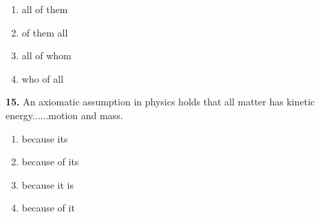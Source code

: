 \documentclass[12pt]{article}
\begin{document}
\begin{enumerate}[label=(\Alph*),leftmargin=*,itemsep=0.2em]
\item all of them
\item of them all
\item all of whom
\item who of all
\end{enumerate}
\par
\vspace{0.25\baselineskip}
\noindent\textbf{15.} An axiomatic assumption in physics holds that all matter has kinetic energy......motion and mass.
\begin{enumerate}[label=(\Alph*),leftmargin=*,itemsep=0.2em]
\item because its
\item because of its
\item because it is
\item because of it
\end{enumerate}
\par
\vspace{0.25\baselineskip}
\end{document}
